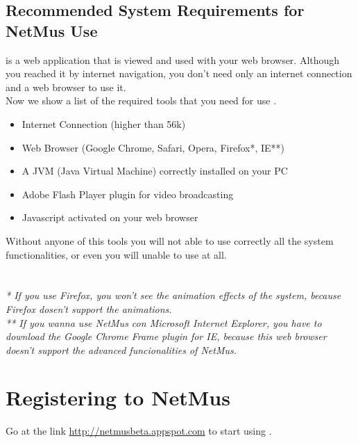 \subsection{Recommended System Requirements for NetMus Use}
 is a web application that is viewed and used with your web browser.
Although you reached it by internet navigation, you don't need only an internet
connection and a web browser to use it.\\

Now we show a list of the required tools that you need for use .

\begin{itemize}
  \item Internet Connection (higher than 56k)
  \item Web Browser (Google Chrome, Safari, Opera, Firefox*, IE**)
  \item A JVM (Java Virtual Machine) correctly installed on your PC
  \item Adobe Flash Player plugin for video broadcasting
  \item Javascript activated on your web browser
\end{itemize}

Without anyone of this tools you will not able to use
correctly all the system functionalities, or even you will unable to use
 at all.\\
\\
\\

\emph{* If you use Firefox, you won't see the animation effects of the
system, because Firefox dosen't support the animations.}\\ 
\emph{** If you wanna use NetMus con Microsoft Internet Explorer, you have to
download the Google Chrome Frame plugin for IE, because this web browser doesn't
support the advanced funcionalities of NetMus.}\\

\section{Registering to NetMus}

Go at the link \url{http://netmusbeta.appspot.com} to start using .\\

